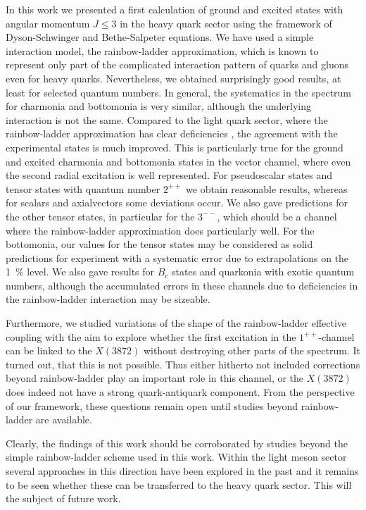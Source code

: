 In this work we presented a first calculation of ground and excited states with angular 
momentum $J \le 3$ in the heavy quark sector using the framework of Dyson-Schwinger 
and Bethe-Salpeter equations. We have used a simple interaction model, the rainbow-ladder
approximation, which is known to represent only part of the complicated interaction
pattern of quarks and gluons even for heavy quarks. Nevertheless, we obtained surprisingly 
good results, at least for selected quantum numbers. In general, the systematics in the 
spectrum for charmonia and bottomonia is very similar, although the underlying interaction 
is not the same. Compared to the light quark sector, where
the rainbow-ladder approximation has clear deficiencies \cite{Fischer:2014xha}, the agreement with
the experimental states is much improved. This is particularly true for the ground and 
excited charmonia and bottomonia states in the vector channel, where even the second 
radial excitation is well represented. For pseudoscalar states and tensor states with quantum 
number $2^{++}$ we obtain reasonable results, whereas for scalars and axialvectors some
deviations occur. We also gave predictions for the other tensor states, in particular
for the $3^{--}$, which should be a channel where the rainbow-ladder approximation
does particularly well. For the bottomonia, our values for the tensor states may be 
considered as solid predictions for experiment with a systematic error due to 
extrapolations on the 1~\% level. We also gave results for $B_c$ states and quarkonia 
with exotic quantum numbers, although the accumulated errors in these channels due to
deficiencies in the rainbow-ladder interaction may be sizeable.

Furthermore, we studied variations of the shape of the rainbow-ladder effective coupling with 
the aim to explore whether the first excitation in the $1^{++}$-channel can be linked 
to the $X(3872)$ without destroying other parts of the spectrum. It turned out, that 
this is not possible. Thus either hitherto not included corrections beyond rainbow-ladder
play an important role in this channel, or the $X(3872)$ does indeed not have a strong
quark-antiquark component. From the perspective of our framework, these questions remain 
open until studies beyond rainbow-ladder are available. 

Clearly, the findings of this work should be corroborated by studies beyond the 
simple rainbow-ladder scheme used in this work. Within the light meson sector
several approaches in this direction have been explored in the past 
\cite{Watson:2004kd,Fischer:2005en,Fischer:2008wy,Fischer:2009jm,Chang:2009zb,Heupel:2014ina}
and it remains to be seen whether these can be transferred to the heavy quark 
sector. This will the subject of future work.
	
	